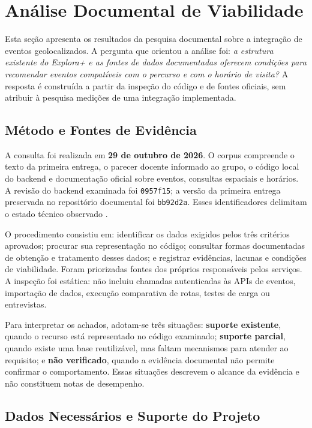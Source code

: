 \section{Análise Documental de Viabilidade}
\label{sec:analise-documental}

Esta seção apresenta os resultados da pesquisa documental sobre a integração de eventos geolocalizados. A pergunta que orientou a análise foi: \textit{a estrutura existente do Explora+ e as fontes de dados documentadas oferecem condições para recomendar eventos compatíveis com o percurso e com o horário de visita?} A resposta é construída a partir da inspeção do código e de fontes oficiais, sem atribuir à pesquisa medições de uma integração implementada.

\subsection{Método e Fontes de Evidência}

A consulta foi realizada em \textbf{29 de outubro de 2026}. O corpus compreende o texto da primeira entrega, o parecer docente informado ao grupo, o código local do backend e documentação oficial sobre eventos, consultas espaciais e horários. A revisão do backend examinada foi \texttt{0957f15}; a versão da primeira entrega preservada no repositório documental foi \texttt{bb92d2a}. Esses identificadores delimitam o estado técnico observado \parencite{explora2026codigo,explora2026entrega}.

O procedimento consistiu em: identificar os dados exigidos pelos três critérios aprovados; procurar sua representação no código; consultar formas documentadas de obtenção e tratamento desses dados; e registrar evidências, lacunas e condições de viabilidade. Foram priorizadas fontes dos próprios responsáveis pelos serviços. A inspeção foi estática: não incluiu chamadas autenticadas às APIs de eventos, importação de dados, execução comparativa de rotas, testes de carga ou entrevistas.

Para interpretar os achados, adotam-se três situações: \textbf{suporte existente}, quando o recurso está representado no código examinado; \textbf{suporte parcial}, quando existe uma base reutilizável, mas faltam mecanismos para atender ao requisito; e \textbf{não verificado}, quando a evidência documental não permite confirmar o comportamento. Essas situações descrevem o alcance da evidência e não constituem notas de desempenho.

\subsection{Dados Necessários e Suporte do Projeto}

